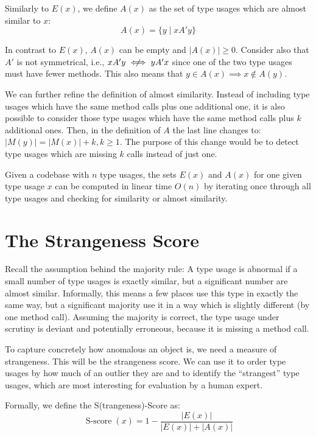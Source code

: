 Similarly to $E(x)$, we define $A(x)$ as the set of type usages which are almost similar to $x$:
\begin{equation*}
A(x) = \{y \mid xA'y \}
\end{equation*}

In contrast to $E(x)$, $A(x)$ can be empty and $|A(x)|\geq0$.
Consider also that $A'$ is not symmetrical, i.e., $xA'y \centernot\iff yA'x$ since one of the two type usages must have fewer methods.
This also means that $y \in A(x) \implies x \notin A(y)$.

We can further refine the definition of almost similarity.
Instead of including type usages which have the same method calls plus one additional one, it is also possible to consider those type usages which have the same method calls plus $k$ additional ones.
Then, in the definition of $A$ the last line changes to: $|M(y)| = |M(x)| + k, k\geq1$.
The purpose of this change would be to detect type usages which are missing $k$ calls instead of just one.

Given a codebase with $n$ type usages, the sets $E(x)$ and $A(x)$ for one given type usage $x$ can be computed in linear time $O(n)$ by iterating once through all type usages and checking for similarity or almost similarity.

\section{The Strangeness Score}

Recall the assumption behind the majority rule: A type usage is abnormal if a small number of type usages is exactly similar, but a significant number are almost similar.
Informally, this means a few places use this type in exactly the same way, but a significant majority use it in a way which is slightly different (by one method call).
Assuming the majority is correct, the type usage under scrutiny is deviant and potentially erroneous, because it is missing a method call.

To capture concretely how anomalous an object is, we need a measure of strangeness.
This will be the strangeness score.
We can use it to order type usages by how much of an outlier they are and to identify the ``strangest'' type usages, which are most interesting for evaluation by a human expert.

Formally, we define the S(trangeness)-Score as:
\begin{equation*}
    \operatorname{S-score}(x) = 1 - \frac{|E(x)|}{|E(x)|+|A(x)|}
\end{equation*}

